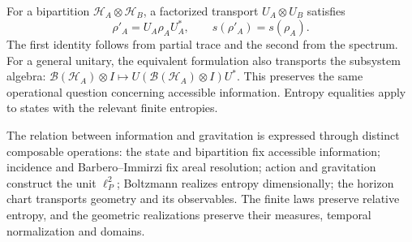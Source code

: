 For a bipartition \(\mathcal H_A\otimes\mathcal H_B\), a
factorized transport \(U_A\otimes U_B\) satisfies
\[
 \rho'_A=U_A\rho_AU_A^*,\qquad s(\rho'_A)=s(\rho_A).
\]
The first identity follows from partial trace and the second from the spectrum.
For a general unitary, the equivalent formulation also transports
the subsystem algebra:
\(\mathcal B(\mathcal H_A)\otimes I\mapsto
U(\mathcal B(\mathcal H_A)\otimes I)U^*\).
This preserves the same operational question concerning accessible
information. Entropy equalities apply to states with the relevant
finite entropies.

The relation between information and gravitation is expressed through
distinct composable operations: the state and bipartition fix
accessible information; incidence and Barbero--Immirzi fix areal
resolution; action and gravitation construct the unit \(\ell_P^2\);
Boltzmann realizes entropy dimensionally; the horizon chart
transports geometry and its observables. The finite laws preserve
relative entropy, and the geometric realizations preserve their measures,
temporal normalization and domains.
